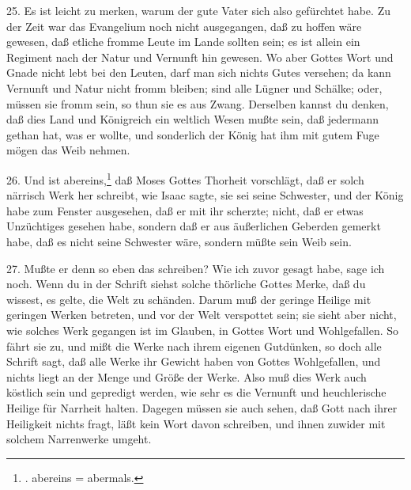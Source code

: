 25. Es ist leicht zu merken, warum der gute Vater sich also gefürchtet habe. Zu der Zeit war das Evangelium noch nicht ausgegangen, daß zu hoffen wäre gewesen, daß etliche fromme Leute im Lande sollten sein; es ist allein ein Regiment nach der Natur und Vernunft hin gewesen. Wo aber Gottes Wort und Gnade nicht lebt bei den Leuten, darf man sich nichts Gutes versehen; da kann Vernunft und Natur nicht fromm bleiben; sind alle Lügner und Schälke; oder, müssen sie fromm sein, so thun sie es aus Zwang. Derselben kannst du denken, daß dies Land und Königreich ein weltlich Wesen mußte sein, daß jedermann gethan hat, was er wollte, und sonderlich der König hat ihm mit gutem Fuge mögen das Weib nehmen.

26. Und ist abereins,\footnote{. abereins = abermals.} daß Moses Gottes Thorheit vorschlägt, daß er solch närrisch Werk her schreibt, wie Isaac sagte, sie sei seine Schwester, und der König habe zum Fenster ausgesehen, daß er mit ihr scherzte; nicht, daß er etwas Unzüchtiges gesehen habe, sondern daß er aus äußerlichen Geberden gemerkt habe, daß es nicht seine Schwester wäre, sondern müßte sein Weib sein.

27. Mußte er denn so eben das schreiben? Wie ich zuvor gesagt habe, sage ich noch. Wenn du in der Schrift siehst solche thörliche Gottes
Merke, daß du wissest, es gelte, die Welt zu schänden. Darum muß der geringe Heilige mit geringen Werken betreten, und vor der Welt verspottet sein; sie sieht aber nicht, wie solches Werk gegangen ist im Glauben, in Gottes Wort und Wohlgefallen. So fährt sie zu, und mißt die Werke nach ihrem eigenen Gutdünken, so doch alle Schrift sagt, daß alle Werke ihr Gewicht haben von Gottes Wohlgefallen, und nichts liegt an der Menge und Größe der Werke. Also muß dies Werk auch köstlich sein und gepredigt werden, wie sehr es die Vernunft und heuchlerische Heilige für Narrheit halten. Dagegen müssen sie auch sehen, daß Gott nach ihrer Heiligkeit nichts fragt, läßt kein Wort davon schreiben, und ihnen zuwider mit solchem Narrenwerke umgeht.

